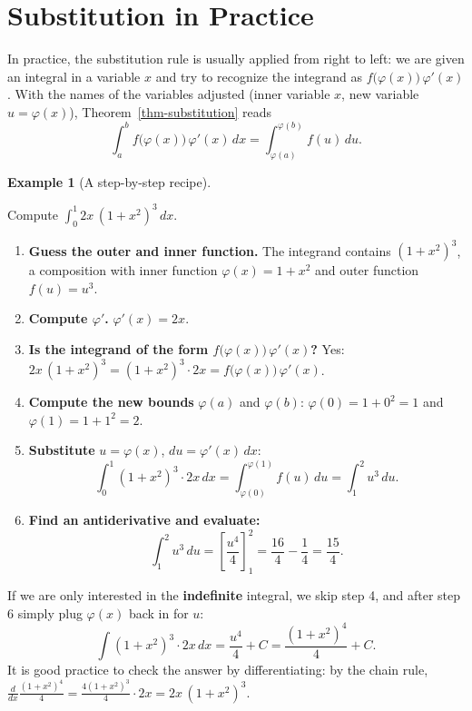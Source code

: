 \documentclass[
  letterpaper,
  DIV=11,
  numbers=noendperiod]{scrreprt}
\providecommand{\tightlist}{%
  \setlength{\itemsep}{0pt}\setlength{\parskip}{0pt}}
\theoremstyle{plain}
\theoremstyle{plain}
\theoremstyle{definition}
\theoremstyle{definition}
\theoremstyle{definition}
\newtheorem{example}{Example}[chapter]
\theoremstyle{plain}
\theoremstyle{plain}
\theoremstyle{remark}
\begin{document}
\section{Substitution in Practice}\label{substitution-in-practice}

In practice, the substitution rule is usually applied from right to
left: we are given an integral in a variable \(x\) and try to recognize
the integrand as \(f\big(\varphi(x)\big)\,\varphi'(x)\). With the names
of the variables adjusted (inner variable \(x\), new variable
\(u=\varphi(x)\)), Theorem~\ref{thm-substitution} reads \[
\int_a^b f\big(\varphi(x)\big)\,\varphi'(x)\,dx = \int_{\varphi(a)}^{\varphi(b)} f(u)\,du .
\]

\begin{example}[A step-by-step
recipe]\protect\hypertarget{exm-substitution-recipe}{}\label{exm-substitution-recipe}

\hfill\break
Compute \(\displaystyle\int_0^1 2x\,(1+x^2)^3\,dx\).

\begin{enumerate}
\def\labelenumi{\arabic{enumi}.}
\tightlist
\item
  \textbf{Guess the outer and inner function.} The integrand contains
  \((1+x^2)^3\), a composition with inner function
  \(\varphi(x) = 1+x^2\) and outer function \(f(u) = u^3\).
\item
  \textbf{Compute \(\varphi'\).} \(\varphi'(x) = 2x\).
\item
  \textbf{Is the integrand of the form
  \(f\big(\varphi(x)\big)\,\varphi'(x)\)?} Yes:
  \(2x\,(1+x^2)^3 = (1+x^2)^3\cdot 2x = f\big(\varphi(x)\big)\,\varphi'(x)\).
\item
  \textbf{Compute the new bounds} \(\varphi(a)\) and \(\varphi(b)\):
  \(\varphi(0) = 1+0^2 = 1\) and \(\varphi(1) = 1+1^2 = 2\).
\item
  \textbf{Substitute} \(u = \varphi(x)\), \(du = \varphi'(x)\,dx\): \[
  \int_0^1 (1+x^2)^3\cdot2x\,dx = \int_{\varphi(0)}^{\varphi(1)} f(u)\,du = \int_1^2 u^3\,du .
  \]
\item
  \textbf{Find an antiderivative and evaluate:} \[
  \int_1^2u^3\,du = \left[\frac{u^4}{4}\right]_1^2 = \frac{16}{4}-\frac14 = \frac{15}{4}.
  \]
\end{enumerate}

\end{example}

If we are only interested in the \textbf{indefinite} integral, we skip
step 4, and after step 6 simply plug \(\varphi(x)\) back in for \(u\):
\[
\int (1+x^2)^3\cdot 2x\,dx = \frac{u^4}{4}+C = \frac{(1+x^2)^4}{4}+C .
\] It is good practice to check the answer by differentiating: by the
chain rule,
\(\frac{d}{dx}\frac{(1+x^2)^4}{4} = \frac{4(1+x^2)^3}{4}\cdot2x = 2x\,(1+x^2)^3\).
\end{document}
